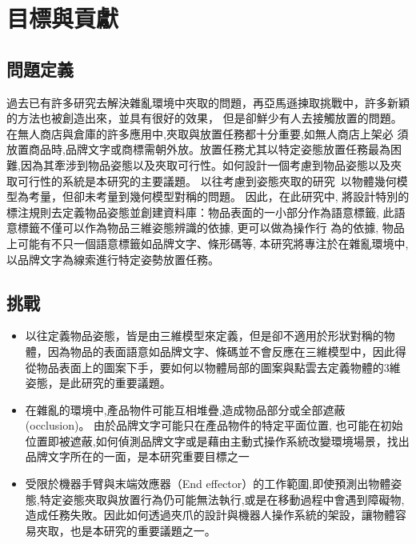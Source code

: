 \section{目標與貢獻}

\subsection{問題定義}
過去已有許多研究去解決雜亂環境中夾取的問題，再亞馬遜揀取挑戰中，許多新穎的方法也被創造出來，並具有很好的效果，
但是卻鮮少有人去接觸放置的問題。在無人商店與倉庫的許多應用中,夾取與放置任務都十分重要,如無人商店上架必
須放置商品時,品牌文字或商標需朝外放。放置任務尤其以特定姿態放置任務最為困
難,因為其牽涉到物品姿態以及夾取可行性。如何設計一個考慮到物品姿態以及夾取可行性的系統是本研究的主要議題。
以往考慮到姿態夾取的研究~\cite{zeng2016multi}以物體幾何模型為考量，但卻未考量到幾何模型對稱的問題。
因此，在此研究中, 將設計特別的標注規則去定義物品姿態並創建資料庫：物品表面的一小部分作為語意標籤, 此語意標籤不僅可以作為物品三維姿態辨識的依據, 更可以做為操作行
為的依據, 物品上可能有不只一個語意標籤如品牌文字、條形碼等, 本研究將專注於在雜亂環境中,以品牌文字為線索進行特定姿勢放置任務。

\subsection{挑戰}
\begin{itemize}
\item 以往定義物品姿態，皆是由三維模型來定義，但是卻不適用於形狀對稱的物體，因為物品的表面語意如品牌文字、條碼並不會反應在三維模型中，因此得從物品表面上的圖案下手，要如何以物體局部的圖案與點雲去定義物體的3維姿態，是此研究的重要議題。
\item 在雜亂的環境中,產品物件可能互相堆疊,造成物品部分或全部遮蔽 (occlusion)。
由於品牌文字可能只在產品物件的特定平面位置, 也可能在初始位置即被遮蔽,如何偵測品牌文字或是藉由主動式操作系統改變環境場景，找出品牌文字所在的一面，是本研究重要目標之一
\item 受限於機器手臂與末端效應器（End effector）的工作範圍,即使預測出物體姿態,特定姿態夾取與放置行為仍可能無法執行,或是在移動過程中會遇到障礙物,造成任務失敗。因此如何透過夾爪的設計與機器人操作系統的架設，讓物體容易夾取，也是本研究的重要議題之一。
\end{itemize}

